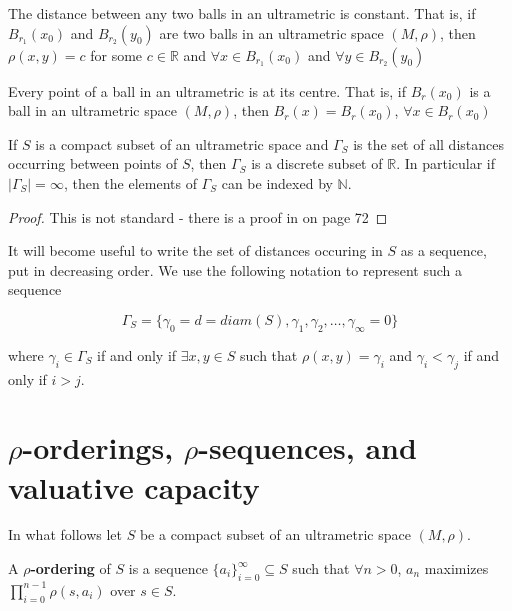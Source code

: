 \begin{proposition*}
\cite{ar} The distance between any two balls in an ultrametric is constant. That is, if $B_{r_1}(x_0)$ and $B_{r_2}(y_0)$ are two balls in an ultrametric space $(M,\rho)$, then $\rho(x,y)=c$ for some $c \in \mathbb{R}$ and $\forall x \in B_{r_1}(x_0)$ and $\forall y \in B_{r_2}(y_0)$
\end{proposition*}

\begin{proposition*}
\cite{ar} Every point of a ball in an ultrametric is at its centre. That is, if $B_r(x_0)$ is a ball in an ultrametric space $(M,\rho)$, then $B_r(x)=B_r(x_0)$,  $\forall x \in B_r(x_0)$
\end{proposition*}


\begin{proposition*}
\cite{ar} If $S$ is a compact subset of an ultrametric space and $\Gamma_S$ is the set of all distances occurring between points of $S$, then $\Gamma_S$ is a discrete subset of $\mathbb{R}$. In particular if $\mid \Gamma_S\mid = \infty$, then the elements of $\Gamma_S$ can be indexed by $\mathbb{N}$.
\end{proposition*}

\begin{proof}
This is not standard - there is a proof in \cite{ar} on page 72
\end{proof}

It will become useful to write the set of distances occuring in $S$ as a sequence, put in decreasing order. We use the following notation to represent such a sequence 

$$\Gamma_S = \{\gamma_0 = d =diam(S), \gamma_1, \gamma_2, \ldots, \gamma_\infty =0 \}$$

where $\gamma_i \in  \Gamma_S$ if and only if $\exists x,y \in S$ such that $\rho(x,y) = \gamma_i$ and  $\gamma_i < \gamma_j$ if and only if $i > j$. 

\newpage
\section*{$\rho$-orderings, $\rho$-sequences, and valuative capacity}

In what follows let $S$ be a compact subset of an ultrametric space $(M,\rho)$.

\begin{definition*}
	\cite{kj} A \textbf{$\rho$-ordering} of $S$ is a sequence $\{a_i\}_{i=0}^\infty \subseteq S$ such that $\forall n > 0$, $a_n$ maximizes $\prod_{i=0}^{n-1} \rho(s,a_i)$ over $s \in S$. 
\end{definition*}


